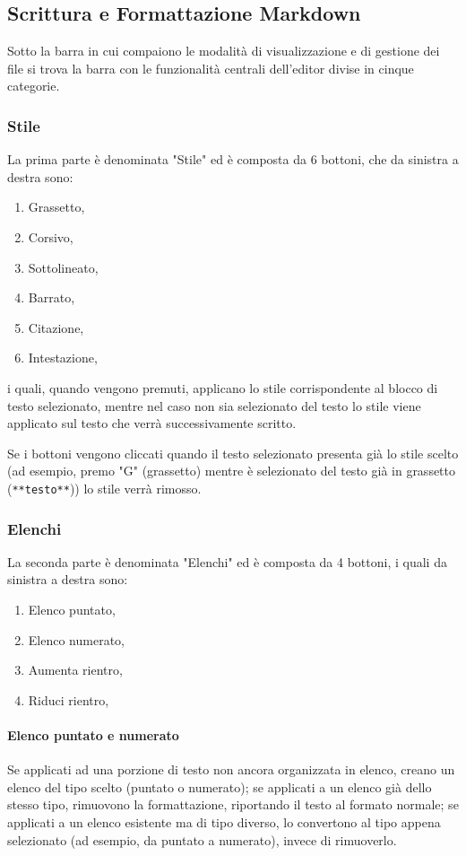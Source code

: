 \subsection{Scrittura e Formattazione Markdown}
Sotto la barra in cui compaiono le modalità di visualizzazione e di gestione dei file si trova la barra con le funzionalità centrali dell'editor divise in cinque categorie.

\subsubsection{Stile}
La prima parte è denominata "Stile" ed è composta da 6 bottoni, che da sinistra a destra sono:
\begin{enumerate}
    \item Grassetto,
    \item Corsivo,
    \item Sottolineato,
    \item Barrato,
    \item Citazione,
    \item Intestazione,
\end{enumerate}

i quali, quando vengono premuti, applicano lo stile corrispondente al blocco di testo selezionato, 
mentre nel caso non sia selezionato del testo lo stile viene applicato sul testo che verrà successivamente scritto.

Se i bottoni vengono cliccati quando il testo selezionato presenta già lo stile scelto (ad 
esempio, premo "G" (grassetto) mentre è selezionato del testo già in grassetto (\texttt{**testo**})) lo stile verrà rimosso.

\subsubsection{Elenchi}
La seconda parte è denominata "Elenchi" ed è composta da 4 bottoni, i quali da sinistra a destra sono:
\begin{enumerate}
    \item Elenco puntato,
    \item Elenco numerato,
    \item Aumenta rientro,
    \item Riduci rientro,
\end{enumerate}

\paragraph{Elenco puntato e numerato} Se applicati ad una porzione di testo non ancora organizzata in elenco, creano un elenco del tipo scelto (puntato 
o numerato); se applicati a un elenco già dello stesso tipo, rimuovono la formattazione, riportando il testo al formato normale; se applicati 
a un elenco esistente ma di tipo diverso, lo convertono al tipo appena selezionato (ad esempio, da puntato a numerato), invece di rimuoverlo. 

